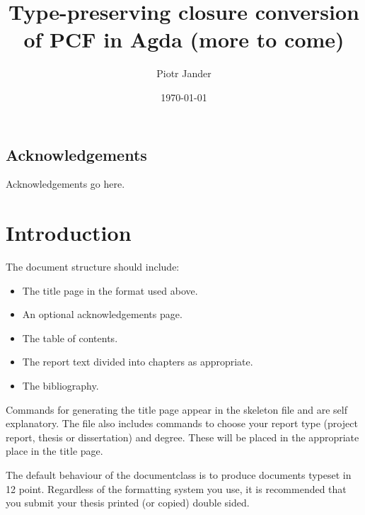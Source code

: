 \documentclass[bsc,frontabs,oneside,singlespacing,parskip,deptreport]{infthesis}
\theoremstyle{definition}
\begin{document}
\title{Type-preserving closure conversion of PCF in Agda (more to come)}

\author{Piotr Jander}


\date{\today}


\maketitle

\section*{Acknowledgements}
Acknowledgements go here.

\tableofcontents



\chapter{Introduction}

The document structure should include:
\begin{itemize}
\item
The title page  in the format used above.
\item
An optional acknowledgements page.
\item
The table of contents.
\item
The report text divided into chapters as appropriate.
\item
The bibliography.
\end{itemize}

Commands for generating the title page appear in the skeleton file and
are self explanatory.
The file also includes commands to choose your report type (project
report, thesis or dissertation) and degree.
These will be placed in the appropriate place in the title page.

The default behaviour of the documentclass is to produce documents typeset in
12 point.  Regardless of the formatting system you use,
it is recommended that you submit your thesis printed (or copied)
double sided.
\end{document}
